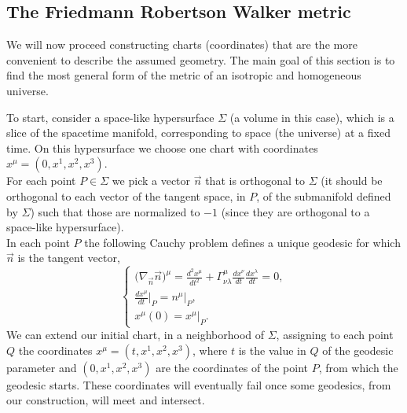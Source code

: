 \subsection{The Friedmann Robertson Walker metric}
We will now proceed constructing charts (coordinates) that are the more convenient to describe the assumed geometry. The main goal of this section is to find the most general form of the metric of an isotropic and homogeneous universe.

To start, consider a space-like hypersurface $\Sigma$ (a volume in this case), which is a slice of the spacetime manifold, corresponding to space (the universe) at a fixed time. On this hypersurface we choose one chart with coordinates $x^\mu=(0,x^1,x^2,x^3)$.\\ For each point $P\in\Sigma$ we pick a vector $\vec n$ that is orthogonal to $\Sigma$ (it should be orthogonal to each vector of the tangent space, in $P$, of the submanifold defined by $\Sigma$) such that those are normalized to $-1$ (since they are orthogonal to a space-like hypersurface).\\ In each point $P$ the following Cauchy problem defines a unique geodesic for which $\vec n$ is the tangent vector,
\begin{equation}\label{Chaucy problem}
    \begin{cases}
        \big(\nabla_{\vec n}\vec n\big)^\mu=\frac{d^2x^\mu}{dt^2}+\Gamma_{\nu\lambda}^{\mu}\frac{dx^\nu}{dt}\frac{dx^\lambda}{dt}=0,\\\frac{dx^\mu}{dt}\big|_{P}=n^\mu\big|_P,\\x^\mu(0)=x^\mu\big|_P.
    \end{cases}
\end{equation}
We can extend our initial chart, in a neighborhood of $\Sigma$, assigning to each point $Q$ the coordinates $x^\mu=(t,x^1,x^2,x^3)$, where $t$ is the value in $Q$ of the geodesic parameter and $(0,x^1,x^2,x^3)$ are the coordinates of the point $P$, from which the geodesic starts. These coordinates will eventually fail once some geodesics, from our construction, will meet and intersect.

